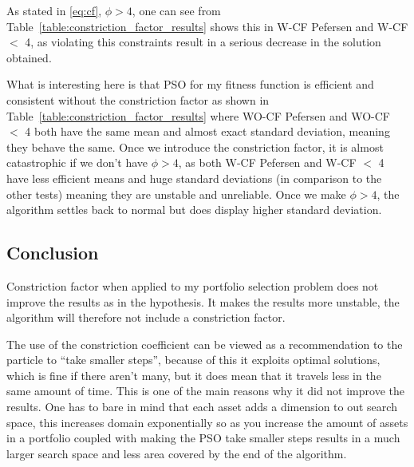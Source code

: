\documentclass{pdfmx4020}
\begin{document}
      As stated in \ref{eq:cf}, $\phi > 4$, one can see from Table~\ref{table:constriction_factor_results} shows this in W-CF Pefersen and W-CF $<$ 4, as violating this constraints result in a serious decrease in the solution obtained. 

      What is interesting here is that PSO for my fitness function is efficient and consistent without the constriction factor as shown in Table~\ref{table:constriction_factor_results} where WO-CF Pefersen and WO-CF $<$ 4 both have the same mean and almost exact standard deviation, meaning they behave the same. Once we introduce the constriction factor, it is almost catastrophic if we don't have $\phi > 4$, as both W-CF Pefersen and W-CF $<$ 4 have less efficient means and huge standard deviations (in comparison to the other tests) meaning they are unstable and unreliable. Once we make $\phi > 4$, the algorithm settles back to normal but does display higher standard deviation. 
    \subsection{Conclusion} %
    \label{sub:conclusion}
      Constriction factor when applied to my portfolio selection problem does not improve the results as in the hypothesis. It makes the results more unstable, the algorithm will therefore not include a constriction factor. 

      The use of the constriction coefficient can be viewed as a recommendation to the particle to ``take smaller steps''\cite{constriction_factor_4}, because of this it exploits optimal solutions, which is fine if there aren't many, but it does mean that it travels less in the same amount of time. This is one of the main reasons why it did not improve the results. One has to bare in mind that each asset adds a dimension to out search space, this increases domain exponentially so as you increase the amount of assets in a portfolio coupled with making the PSO take smaller steps results in a much larger search space and less area covered by the end of the algorithm. 
       

\end{document}
